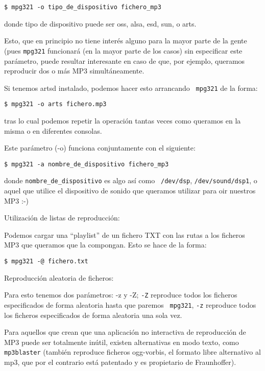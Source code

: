 \begin{verbatim}
$ mpg321 -o tipo_de_dispositivo fichero_mp3
\end{verbatim}

\noindent donde tipo  de dispositivo puede ser oss, alsa,  esd, sun, o
arts.

Esto, que en principio no tiene  interés alguno para la mayor parte de
la  gente (pues  {\tt mpg321}  funcionará (en  la mayor  parte de  los
casos)  sin especificar  este  parámetro,  puede resultar  interesante
en  caso de  que,  por  ejemplo, queramos  reproducir  dos  o más  MP3
simultáneamente.

Si tenemos {\sf  artsd} instalado, podemos hacer  esto arrancando {\tt
mpg321} de la forma:

\begin{verbatim}
$ mpg321 -o arts fichero.mp3
\end{verbatim}

tras lo cual  podemos repetir la operación tantas  veces como queramos
en la misma o en diferentes consolas.

Este parámetro (-o) funciona conjuntamente con el siguiente:

\begin{verbatim}
$ mpg321 -a nombre_de_dispositivo fichero_mp3 
\end{verbatim}

\noindent donde  {\tt nombre\_de\_dispositivo}  es algo así  como {\tt
/dev/dsp}, {\tt  /dev/sound/dsp1}, o aquel que  utilice el dispositivo
de sonido que queramos utilizar para oir nuestros MP3 :-)

Utilización de listas de reproducción:

Podemos cargar una ``playlist'' de un  fichero TXT con las rutas a los
ficheros MP3 que queramos que la compongan. Esto se hace de la forma:

\begin{verbatim}
$ mpg321 -@ fichero.txt
\end{verbatim}

Reproducción aleatoria de ficheros:

Para esto  tenemos dos parámetros: -z  y -Z; {\tt -Z}  reproduce todos
los ficheros especificados  de forma aleatoria hasta  que paremos {\tt
mpg321}, {\tt -z} reproduce todos  los ficheros especificados de forma
aleatoria una sola vez.

Para  aquellos  que  crean  que   una  aplicación  no  interactiva  de
reproducción de MP3 puede  ser totalmente inútil, existen alternativas
en  modo  texto, como  {\tt  mp3blaster}  (también reproduce  ficheros
ogg-vorbis, el formato libre alternativo  al mp3, que por el contrario
está patentado y es propietario de Fraunhoffer).

